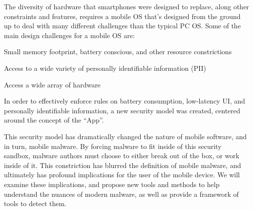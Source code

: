 The diversity of hardware that smartphones were designed to replace, along other constraints and features, requires a mobile OS that's designed from the ground up to deal with many different challenges than the typical PC OS. Some of the main design challenges for a mobile OS are: 
\begin{smitemize}

\item Small memory footprint, battery conscious, and other resource constrictions

\item Access to a wide variety of personally identifiable information (PII)

\item Access a wide array of hardware

\end{smitemize}
In order to effectively enforce rules on battery consumption, low-latency UI, and personally identifiable information, a new security model was created, centered around the concept of the ``App''. 

This security model has dramatically changed the nature of mobile software, and in turn, mobile malware. By forcing malware to fit inside of this security sandbox, malware authors must choose to either break out of the box, or work inside of it. This constriction has blurred the definition of mobile malware, and ultimately has profound implications for the user of the mobile device. We will examine these implications, and propose new tools and methods to help understand the nuances of modern malware, as well as provide a framework of tools to detect them.

